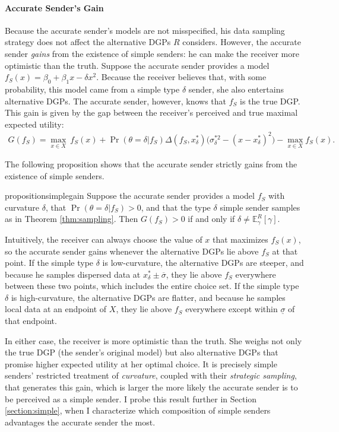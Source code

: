 \documentclass[11pt,dvipsnames]{article}
\begin{document}
\paragraph{Accurate Sender's Gain}
Because the accurate sender's models are not misspecified, his data sampling strategy does not affect the alternative DGPs $R$ considers.
However, the accurate sender \emph{gains} from the existence of simple senders: he can make the receiver more optimistic than the truth.
Suppose the accurate sender provides a model $f_S(x) = \beta_0+\beta_1x-\delta x^2$.
Because the receiver believes that, with some probability, this model came from a simple type $\delta$ sender, she also entertains alternative DGPs.
The accurate sender, however, knows that $f_S$ is the true DGP.
This gain is given by the gap between the receiver's perceived and true maximal expected utility:
\begin{align*}
G(f_S) = \max_{x \in X}\ f_S(x)+\Pr(\theta=\delta|f_S)\Delta(f_S,x_\delta^*)\big(\sigma_\delta^{*2}-(x-x_\delta^*)^2\big) - \max_{x\in X} f_S(x).
\end{align*}

The following proposition shows that the accurate sender strictly gains from the existence of simple senders.
\begin{restatable}{proposition}{simplegain}
Suppose the accurate sender provides a model $f_S$ with curvature $\delta$, that $\Pr(\theta=\delta|f_S)>0$, and that the type $\delta$ simple sender samples as in Theorem \ref{thm:sampling}.
Then $G(f_S)>0$ if and only if $\delta\neq\mathbb{E}_\gamma^R[\gamma]$.
\label{prop:simplegain}
\end{restatable}

Intuitively, the receiver can always choose the value of $x$ that maximizes $f_S(x)$, so the accurate sender gains whenever the alternative DGPs lie above $f_S$ at that point.
If the simple type $\delta$ is low-curvature, the alternative DGPs are steeper, and because he samples dispersed data at $x_\delta^* \pm \overline{\sigma}$, they lie above $f_S$ everywhere between these two points, which includes the entire choice set.
If the simple type $\delta$ is high-curvature, the alternative DGPs are flatter, and because he samples local data at an endpoint of $X$, they lie above $f_S$ everywhere except within $\underline{\sigma}$ of that endpoint.

In either case, the receiver is more optimistic than the truth.
She weighs not only the true DGP (the sender's original model) but also alternative DGPs that promise higher expected utility at her optimal choice.
It is precisely simple senders' restricted treatment of \emph{curvature}, coupled with their \emph{strategic sampling}, that generates this gain, which is larger the more likely the accurate sender is to be perceived as a simple sender.
I probe this result further in Section \ref{section:simple}, when I characterize which composition of simple senders advantages the accurate sender the most.
\end{document}

